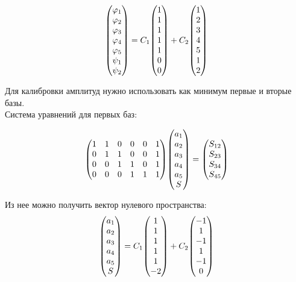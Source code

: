 \begin{equation}
	\mqty(
	\phi_{1}\\	\phi_{2}\\	\phi_{3}\\	\phi_{4}\\	\phi_{5}\\ \psi_1\\ \psi_2\\
	)=
	C_1	\mqty(
	1\\	1\\	1\\	1\\	1\\	0\\ 0\\
	)+
	C_2	\mqty(
	1\\	2\\	3\\	4\\	5\\	1\\ 2\\
	)
\end{equation}

Для калибровки амплитуд нужно использовать как минимум первые и вторые базы.\\
Система уравнений для первых баз:

\begin{equation}
	\mqty( %
	1&1&0&0&0&1\\	0&1&1&0&0&1\\	0&0&1&1&0&1\\	0&0&0&1&1&1
	)
	\mqty(
	a_{1}\\	a_{2}\\	a_{3}\\	a_{4}\\	a_{5}\\	S
	)=
	\mqty(
	S_{12}\\	S_{23}\\	S_{34}\\	S_{45}
	)
\end{equation}

Из нее можно получить вектор нулевого пространства:
\begin{equation}
	\mqty(
	a_{1}\\	a_{2}\\	a_{3}\\	a_{4}\\	a_{5}\\	S
	)=C_1
	\mqty(
	1\\	1\\	1\\	1\\	1\\ -2\\
	)+C_2
	\mqty(
	-1\\ 1\\ -1\\ 1\\ -1\\  0\\
	)
\end{equation}

